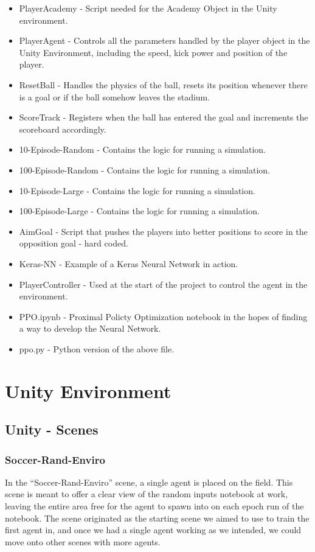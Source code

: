 \begin{itemize}
    \item PlayerAcademy - Script needed for the Academy Object in the Unity environment.
    \item PlayerAgent - Controls all the parameters handled by the player object in the Unity Environment, including the speed, kick power and position of the player.
    \item ResetBall - Handles the physics of the ball, resets its position whenever there is a goal or if the ball somehow leaves the stadium.
    \item ScoreTrack - Registers when the ball has entered the goal and increments the scoreboard accordingly.
    \item 10-Episode-Random - Contains the logic for running a simulation.
    \item 100-Episode-Random - Contains the logic for running a simulation.
    \item 10-Episode-Large - Contains the logic for running a simulation.
    \item 100-Episode-Large - Contains the logic for running a simulation.
    \item AimGoal - Script that pushes the players into better positions to score in the opposition goal - hard coded.
    \item Keras-NN - Example of a Keras Neural Network in action.
    \item PlayerController - Used at the start of the project to control the agent in the environment.
    \item PPO.ipynb - Proximal Policty Optimization notebook in the hopes of finding a way to develop the Neural Network.
    \item ppo.py - Python version of the above file.
\end{itemize}

\section{Unity Environment}

\subsection{Unity - Scenes}
\subsubsection{Soccer-Rand-Enviro}
In the “Soccer-Rand-Enviro” scene, a single agent is placed on the field. This scene is meant to offer a clear view of the random inputs notebook at work, leaving the entire area free for the agent to spawn into on each epoch run of the notebook. The scene originated as the starting scene we aimed to use to train the first agent in, and once we had a single agent working as we intended, we could move onto other scenes with more agents.

